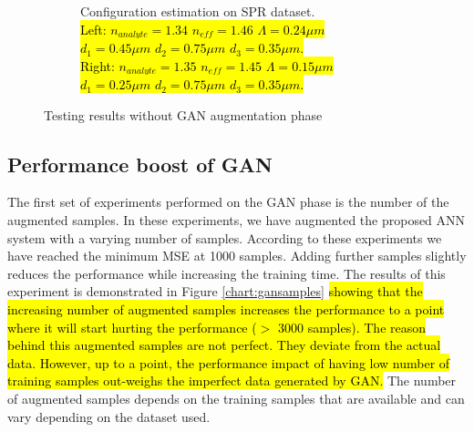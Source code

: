 \documentclass[journal]{IEEEtran}
\begin{document}
\begin{figure}
\begin{subfigure}{\textwidth}
		\captionsetup{justification=centering}
		\caption{Configuration estimation on SPR dataset.
		\\\hl{Left: $ n_{analyte} = 1.34 $ $ n_{eff} = 1.46$ $ \Lambda = 0.24 \mu m$ $ d_1 = 0.45 \mu m $ $ d_2= 0.75 \mu m$ $ d_3 = 0.35 \mu m $.}\\ \hl{Right: $ n_{analyte} = 1.35 $	$ n_{eff} = 1.45 $ $ \Lambda = 0.15 \mu m $ $ d_1 = 0.25 \mu m $ $ d_2= 0.75 \mu m $ $ d_3 = 0.35 \mu m  $.}		
		  }
	\end{subfigure}
	\caption{Testing results without GAN augmentation phase}
	\label{chart:perfnoaug}
\end{figure}


\subsection{Performance boost of GAN}

The first set of experiments performed on the GAN phase is the number of the augmented samples. In these experiments, we have augmented the proposed ANN system with a varying number of samples. According to these experiments we have reached the minimum MSE at 1000 samples. Adding further samples slightly reduces the performance while increasing the training time. The results of this experiment is demonstrated in Figure \ref{chart:gansamples} \hl{showing that the increasing number of augmented samples increases the performance to a point where it will start hurting the performance ($>$ 3000 samples). The reason behind this augmented samples are not perfect. They deviate from the actual data. However, up to a point, the performance impact of having low number of training samples out-weighs the imperfect data generated by GAN.} The number of augmented samples depends on the training samples that are available and can vary depending on the dataset used. 
\end{document}
